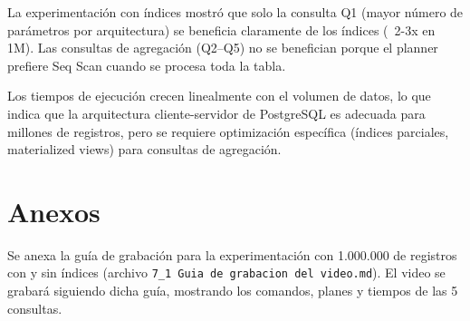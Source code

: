 \documentclass[12pt,a4paper]{article}
\begin{document}
La experimentación con índices mostró que solo la consulta Q1 (mayor número de parámetros por arquitectura) se beneficia claramente de los índices (~2-3x en 1M). Las consultas de agregación (Q2–Q5) no se benefician porque el planner prefiere Seq Scan cuando se procesa toda la tabla.

Los tiempos de ejecución crecen linealmente con el volumen de datos, lo que indica que la arquitectura cliente-servidor de PostgreSQL es adecuada para millones de registros, pero se requiere optimización específica (índices parciales, materialized views) para consultas de agregación.

\section{Anexos}

Se anexa la guía de grabación para la experimentación con 1.000.000 de registros con y sin índices (archivo \texttt{7\_1 Guia de grabacion del video.md}). El video se grabará siguiendo dicha guía, mostrando los comandos, planes y tiempos de las 5 consultas.
\end{document}
